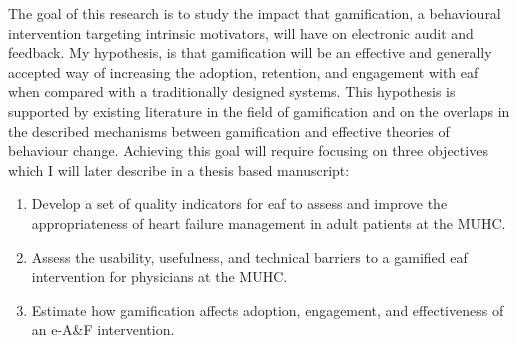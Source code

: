 The goal of this research is to study the impact that gamification, a behavioural intervention targeting intrinsic motivators, will have on electronic audit and feedback. My hypothesis, is that gamification will be an effective and generally accepted way of increasing the adoption, retention, and engagement with \gls{eaf} when compared with a traditionally designed systems. This hypothesis is supported by existing literature in the field of gamification and on the overlaps in the described mechanisms between gamification and effective theories of behaviour change. Achieving this goal will require focusing on three objectives which I will later describe in a thesis based manuscript:

\begin{enumerate}
    \item Develop a set of quality indicators for \gls{eaf} to assess and improve the appropriateness of heart failure management in adult patients at the MUHC.
    \item Assess the usability, usefulness, and technical barriers to a gamified \gls{eaf} intervention for physicians at the MUHC.
    \item Estimate how gamification affects adoption, engagement, and effectiveness of an e-A\&F intervention.
\end{enumerate}